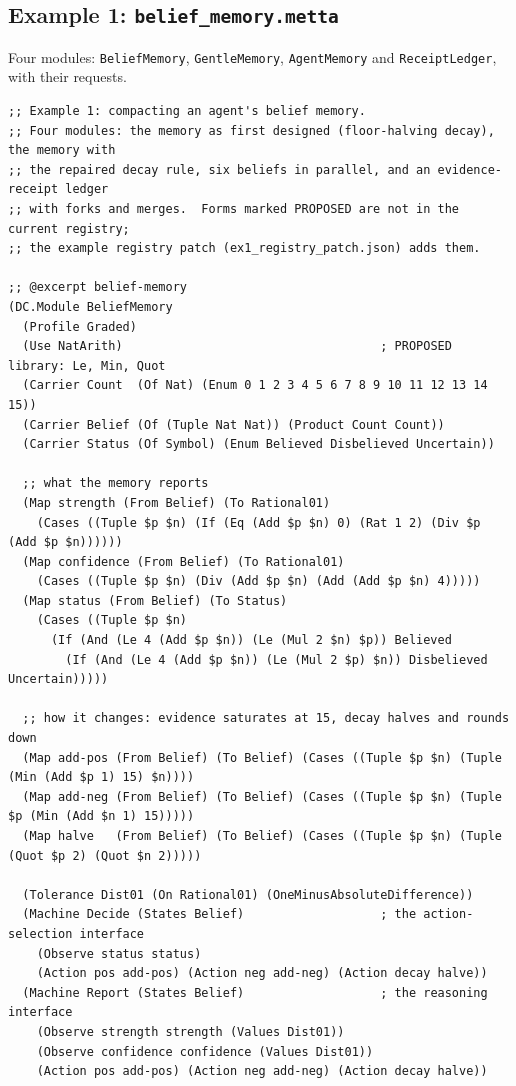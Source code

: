 \documentclass[11pt]{article}
\newcommand{\fpath}[1]{\nolinkurl{#1}}
\newcommand{\code}[1]{\texttt{#1}}
\theoremstyle{definition}
\theoremstyle{plain}
\begin{document}
\subsection{Example 1: \texorpdfstring{\fpath{belief_memory.metta}}{belief\_memory.metta}}
Four modules: \code{BeliefMemory}, \code{GentleMemory}, \code{AgentMemory} and \code{ReceiptLedger}, with their requests.
\begin{lstlisting}[style=mettafull]
;; Example 1: compacting an agent's belief memory.
;; Four modules: the memory as first designed (floor-halving decay), the memory with
;; the repaired decay rule, six beliefs in parallel, and an evidence-receipt ledger
;; with forks and merges.  Forms marked PROPOSED are not in the current registry;
;; the example registry patch (ex1_registry_patch.json) adds them.

;; @excerpt belief-memory
(DC.Module BeliefMemory
  (Profile Graded)
  (Use NatArith)                                    ; PROPOSED library: Le, Min, Quot
  (Carrier Count  (Of Nat) (Enum 0 1 2 3 4 5 6 7 8 9 10 11 12 13 14 15))
  (Carrier Belief (Of (Tuple Nat Nat)) (Product Count Count))
  (Carrier Status (Of Symbol) (Enum Believed Disbelieved Uncertain))

  ;; what the memory reports
  (Map strength (From Belief) (To Rational01)
    (Cases ((Tuple $p $n) (If (Eq (Add $p $n) 0) (Rat 1 2) (Div $p (Add $p $n))))))
  (Map confidence (From Belief) (To Rational01)
    (Cases ((Tuple $p $n) (Div (Add $p $n) (Add (Add $p $n) 4)))))
  (Map status (From Belief) (To Status)
    (Cases ((Tuple $p $n)
      (If (And (Le 4 (Add $p $n)) (Le (Mul 2 $n) $p)) Believed
        (If (And (Le 4 (Add $p $n)) (Le (Mul 2 $p) $n)) Disbelieved Uncertain)))))

  ;; how it changes: evidence saturates at 15, decay halves and rounds down
  (Map add-pos (From Belief) (To Belief) (Cases ((Tuple $p $n) (Tuple (Min (Add $p 1) 15) $n))))
  (Map add-neg (From Belief) (To Belief) (Cases ((Tuple $p $n) (Tuple $p (Min (Add $n 1) 15)))))
  (Map halve   (From Belief) (To Belief) (Cases ((Tuple $p $n) (Tuple (Quot $p 2) (Quot $n 2)))))

  (Tolerance Dist01 (On Rational01) (OneMinusAbsoluteDifference))
  (Machine Decide (States Belief)                   ; the action-selection interface
    (Observe status status)
    (Action pos add-pos) (Action neg add-neg) (Action decay halve))
  (Machine Report (States Belief)                   ; the reasoning interface
    (Observe strength strength (Values Dist01))
    (Observe confidence confidence (Values Dist01))
    (Action pos add-pos) (Action neg add-neg) (Action decay halve))


\end{lstlisting}
\end{document}
